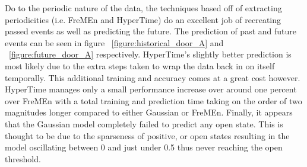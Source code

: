 Do to the periodic nature of the data, the techniques based off of extracting
periodicities (i.e. FreMEn and HyperTime) do an excellent job of recreating
passed events as well as predicting the future. The prediction of past and future events can be seen in
figure ~\ref{figure:historical_door_A} and ~\ref{figure:future_door_A} respectively. HyperTime's slightly better
prediction is most likely due to the extra steps taken to wrap the data back
in on itself temporally.  This additional training and accuracy comes at a
great cost however. HyperTime manages only a small performance increase over
around one percent over FreMEn with a total training and prediction time
taking on the order of two magnitudes longer compared to either Gaussian or FreMEn.
Finally, it appears that the Gaussian model completely failed to predict any
open state.  This is thought to be due to the sparseness of positive, or open
states resulting in the model oscillating between 0 and just under 0.5 thus
never reaching the open threshold. \\

